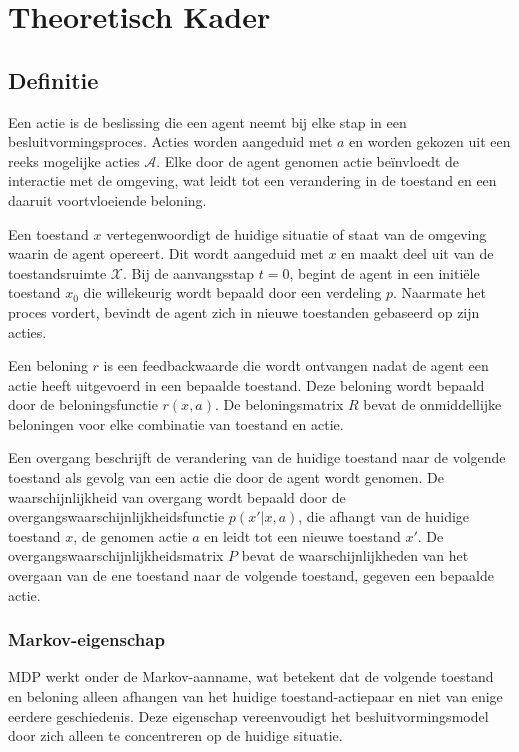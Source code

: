 \documentclass[a4paper,12pt]{report}
\begin{document}
\chapter*{Theoretisch Kader}

\section*{Definitie}
Een actie is de beslissing die een agent neemt bij elke stap in een
besluitvormingsproces. Acties worden aangeduid met \( a \) en worden gekozen
uit een reeks mogelijke acties \( \mathcal{A} \). Elke door de agent genomen
actie beïnvloedt de interactie met de omgeving, wat leidt tot een verandering
in de toestand en een daaruit voortvloeiende beloning.

Een toestand \( x \) vertegenwoordigt de huidige situatie of staat van de
omgeving waarin de agent opereert. Dit wordt aangeduid met \( x \) en maakt
deel uit van de toestandsruimte \( \mathcal{X} \). Bij de aanvangsstap \( t = 0
\), begint de agent in een initiële toestand \( x_0 \) die willekeurig wordt
bepaald door een verdeling \( p \). Naarmate het proces vordert, bevindt de
agent zich in nieuwe toestanden gebaseerd op zijn acties.

Een beloning \( r \) is een feedbackwaarde die wordt ontvangen nadat de agent
een actie heeft uitgevoerd in een bepaalde toestand. Deze beloning wordt
bepaald door de beloningsfunctie \( r(x, a) \). De beloningsmatrix \( R \)
bevat de onmiddellijke beloningen voor elke combinatie van toestand en actie.

Een overgang beschrijft de verandering van de huidige toestand naar de volgende
toestand als gevolg van een actie die door de agent wordt genomen. De
waarschijnlijkheid van overgang wordt bepaald door de
overgangswaarschijnlijkheidsfunctie \( p(x'|x, a) \), die afhangt van de
huidige toestand \( x \), de genomen actie \( a \) en leidt tot een nieuwe
toestand \( x' \). De overgangswaarschijnlijkheidsmatrix \( P \) bevat de
waarschijnlijkheden van het overgaan van de ene toestand naar de volgende
toestand, gegeven een bepaalde actie.

\subsection*{Markov-eigenschap}

MDP werkt onder de Markov-aanname, wat betekent dat de volgende toestand en
beloning alleen afhangen van het huidige toestand-actiepaar en niet van enige
eerdere geschiedenis. Deze eigenschap vereenvoudigt het besluitvormingsmodel
door zich alleen te concentreren op de huidige situatie.
\end{document}
